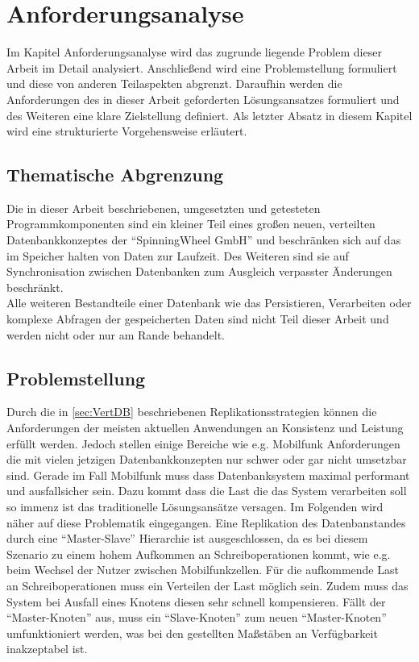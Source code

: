 \documentclass[a4paper,11pt,oneside,%
headsepline,												%
footsepline,												%
bibtotocnumbered									%
]{scrreprt}
\begin{document}
\chapter{Anforderungsanalyse}
Im Kapitel Anforderungsanalyse wird das zugrunde liegende Problem dieser Arbeit im Detail analysiert. Anschließend wird eine Problemstellung formuliert und diese von anderen Teilaspekten abgrenzt. Daraufhin werden die Anforderungen des in dieser Arbeit geforderten Lösungsansatzes formuliert und des Weiteren eine klare Zielstellung definiert.  
Als letzter Absatz in diesem Kapitel wird eine strukturierte Vorgehensweise erläutert.


\section{Thematische Abgrenzung}
Die in dieser Arbeit beschriebenen, umgesetzten und getesteten Programmkomponenten sind ein kleiner Teil eines großen neuen, verteilten Datenbankkonzeptes der \enquote{SpinningWheel GmbH} und beschränken sich auf das im Speicher halten von Daten zur Laufzeit. Des Weiteren sind sie auf Synchronisation zwischen Datenbanken zum Ausgleich verpasster Änderungen beschränkt.\\

Alle weiteren Bestandteile einer Datenbank wie das Persistieren, Verarbeiten oder komplexe Abfragen der gespeicherten Daten sind nicht Teil dieser Arbeit und werden nicht oder nur am Rande behandelt.  

\section{Problemstellung}
Durch die in \autoref{sec:VertDB} beschriebenen Replikationsstrategien können die Anforderungen der meisten aktuellen Anwendungen an Konsistenz und Leistung erfüllt werden. Jedoch stellen einige Bereiche wie e.g. Mobilfunk Anforderungen die mit vielen jetzigen Datenbankkonzepten nur schwer oder gar nicht umsetzbar sind. Gerade im Fall Mobilfunk muss dass Datenbanksystem maximal performant und ausfallsicher sein. Dazu kommt dass die Last die das System verarbeiten soll so immenz ist das traditionelle Lösungsansätze versagen. Im Folgenden wird näher auf diese Problematik eingegangen. Eine Replikation des Datenbanstandes durch eine \enquote{Master-Slave} Hierarchie ist ausgeschlossen, da es bei diesem Szenario zu einem hohem Aufkommen an Schreiboperationen kommt, wie e.g. beim Wechsel der Nutzer zwischen Mobilfunkzellen. Für die aufkommende Last an Schreiboperationen muss ein Verteilen der Last möglich sein. Zudem muss das System bei Ausfall eines Knotens diesen sehr schnell kompensieren. Fällt der \enquote{Master-Knoten} aus, muss ein \enquote{Slave-Knoten} zum neuen \enquote{Master-Knoten} umfunktioniert werden, was bei den gestellten Maßstäben an Verfügbarkeit inakzeptabel ist.\\
\end{document}
